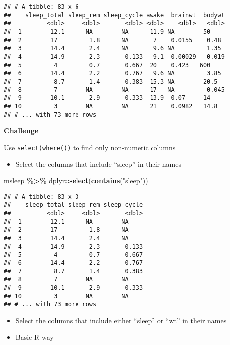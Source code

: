 \documentclass[
]{book}
\newenvironment{Shaded}{\begin{snugshade}}{\end{snugshade}}
\newcommand{\KeywordTok}[1]{\textcolor[rgb]{0.13,0.29,0.53}{\textbf{#1}}}
\newcommand{\NormalTok}[1]{#1}
\newcommand{\OperatorTok}[1]{\textcolor[rgb]{0.81,0.36,0.00}{\textbf{#1}}}
\newcommand{\StringTok}[1]{\textcolor[rgb]{0.31,0.60,0.02}{#1}}
\providecommand{\tightlist}{%
  \setlength{\itemsep}{0pt}\setlength{\parskip}{0pt}}
\begin{document}
\begin{verbatim}
## # A tibble: 83 x 6
##    sleep_total sleep_rem sleep_cycle awake  brainwt  bodywt
##          <dbl>     <dbl>       <dbl> <dbl>    <dbl>   <dbl>
##  1        12.1      NA        NA      11.9 NA        50    
##  2        17         1.8      NA       7    0.0155    0.48 
##  3        14.4       2.4      NA       9.6 NA         1.35 
##  4        14.9       2.3       0.133   9.1  0.00029   0.019
##  5         4         0.7       0.667  20    0.423   600    
##  6        14.4       2.2       0.767   9.6 NA         3.85 
##  7         8.7       1.4       0.383  15.3 NA        20.5  
##  8         7        NA        NA      17   NA         0.045
##  9        10.1       2.9       0.333  13.9  0.07     14    
## 10         3        NA        NA      21    0.0982   14.8  
## # ... with 73 more rows
\end{verbatim}

\textbf{Challenge}

Use \texttt{select(where())} to find only non-numeric columns

\begin{itemize}
\tightlist
\item
  Select the columns that include ``sleep'' in their names
\end{itemize}

\begin{Shaded}
\begin{Highlighting}[]
\NormalTok{msleep }\OperatorTok{\%\textgreater{}\%}
\StringTok{  }\NormalTok{dplyr}\OperatorTok{::}\KeywordTok{select}\NormalTok{(}\KeywordTok{contains}\NormalTok{(}\StringTok{"sleep"}\NormalTok{))}
\end{Highlighting}
\end{Shaded}

\begin{verbatim}
## # A tibble: 83 x 3
##    sleep_total sleep_rem sleep_cycle
##          <dbl>     <dbl>       <dbl>
##  1        12.1      NA        NA    
##  2        17         1.8      NA    
##  3        14.4       2.4      NA    
##  4        14.9       2.3       0.133
##  5         4         0.7       0.667
##  6        14.4       2.2       0.767
##  7         8.7       1.4       0.383
##  8         7        NA        NA    
##  9        10.1       2.9       0.333
## 10         3        NA        NA    
## # ... with 73 more rows
\end{verbatim}

\begin{itemize}
\item
  Select the columns that include either ``sleep'' or ``wt'' in their names
\item
  Basic R way
\end{itemize}
\end{document}
